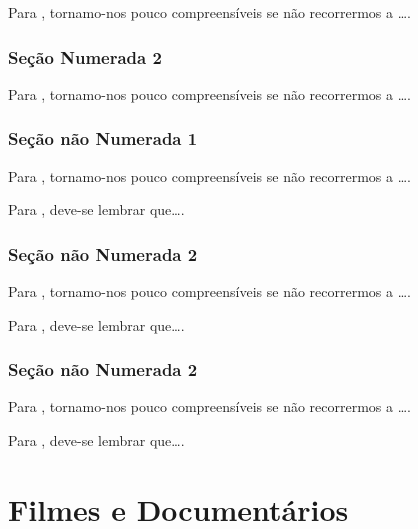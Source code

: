 \documentclass[
]{book}
\begin{document}
Para \citet{BOCK2001}, tornamo-nos pouco compreensíveis se não recorrermos a \ldots.

\hypertarget{seuxe7uxe3o-numerada-2-14}{%
\subsection{Seção Numerada 2}\label{seuxe7uxe3o-numerada-2-14}}

Para \citet{BOCK2001}, tornamo-nos pouco compreensíveis se não recorrermos a \ldots.

\hypertarget{seuxe7uxe3o-nuxe3o-numerada-1-29}{%
\subsection*{Seção não Numerada 1}\label{seuxe7uxe3o-nuxe3o-numerada-1-29}}

Para \citet{BOCK2001}, tornamo-nos pouco compreensíveis se não recorrermos a \ldots.

Para \citet{DAVIDOFF2001}, deve-se lembrar que\ldots.

\hypertarget{seuxe7uxe3o-nuxe3o-numerada-2-43}{%
\subsection*{Seção não Numerada 2}\label{seuxe7uxe3o-nuxe3o-numerada-2-43}}

Para \citet{BOCK2001}, tornamo-nos pouco compreensíveis se não recorrermos a \ldots.

Para \citet{DAVIDOFF2001}, deve-se lembrar que\ldots.

\hypertarget{seuxe7uxe3o-nuxe3o-numerada-2-44}{%
\subsection*{Seção não Numerada 2}\label{seuxe7uxe3o-nuxe3o-numerada-2-44}}

Para \citet{BOCK2001}, tornamo-nos pouco compreensíveis se não recorrermos a \ldots.

Para \citet{DAVIDOFF2001}, deve-se lembrar que\ldots.

\hypertarget{filmes-e-documentuxe1rios}{%
\chapter{Filmes e Documentários}\label{filmes-e-documentuxe1rios}}
\end{document}
